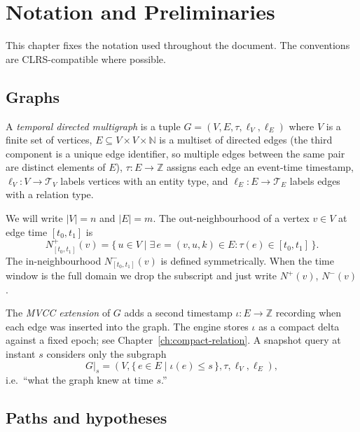 \chapter{Notation and Preliminaries}
\label{ch:notation}

This chapter fixes the notation used throughout the document. The
conventions are CLRS-compatible where possible.

\section{Graphs}

\begin{definition}
A \emph{temporal directed multigraph} is a tuple $G = (V, E, \tau,
\ell_V, \ell_E)$ where $V$ is a finite set of vertices, $E \subseteq
V \times V \times \mathbb{N}$ is a multiset of directed edges (the
third component is a unique edge identifier, so multiple edges
between the same pair are distinct elements of $E$), $\tau : E \to
\mathbb{Z}$ assigns each edge an event-time timestamp, $\ell_V : V
\to \mathcal{T}_V$ labels vertices with an entity type, and $\ell_E
: E \to \mathcal{T}_E$ labels edges with a relation type.
\end{definition}

We will write $|V| = n$ and $|E| = m$. The out-neighbourhood of a
vertex $v \in V$ at edge time $[t_0, t_1]$ is
\[
    N^{+}_{[t_0, t_1]}(v) = \{\, u \in V \mid \exists\, e = (v, u,
    k) \in E : \tau(e) \in [t_0, t_1]\,\}.
\]
The in-neighbourhood $N^{-}_{[t_0, t_1]}(v)$ is defined symmetrically.
When the time window is the full domain we drop the subscript and
just write $N^{+}(v)$, $N^{-}(v)$.

\begin{definition}
The \emph{MVCC extension} of $G$ adds a second timestamp
$\iota : E \to \mathbb{Z}$ recording when each edge was inserted
into the graph. The engine stores $\iota$ as a compact delta
against a fixed epoch; see Chapter~\ref{ch:compact-relation}. A
snapshot query at instant $s$ considers only the subgraph
\[
    G|_{s} = (V, \{\,e \in E \mid \iota(e) \leq s\,\}, \tau, \ell_V,
    \ell_E),
\]
i.e.\ ``what the graph knew at time $s$.''
\end{definition}

\section{Paths and hypotheses}

